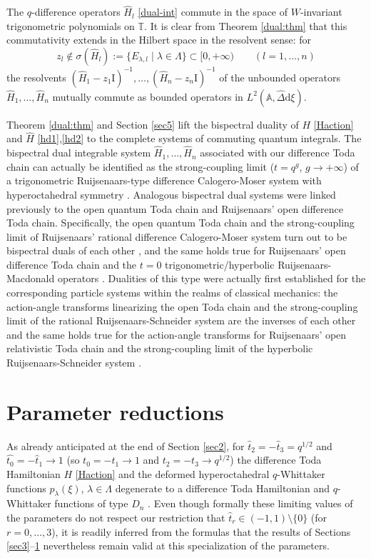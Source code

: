 \documentclass[reqno]{amsart}
\theoremstyle{remark}
\numberwithin{equation}{section}
\begin{document}
The $q$-difference operators  $\hat{H}_l$ \eqref{dual-int} commute in the space of $W$-invariant trigonometric polynomials on $\mathbb{T}$.
It is clear from Theorem \ref{dual:thm} that this commutativity extends in the Hilbert space in the resolvent sense: for $$z_l \not\in\sigma (\hat{H}_l):=\{ E_{\lambda ,l}\mid\lambda\in\Lambda\}\subset [0,+\infty) \qquad
(l=1,\ldots ,n) $$
the resolvents $(\hat{H}_1-z_1\text{I})^{-1},\ldots ,(\hat{H}_n-z_n\text{I})^{-1}$ of the unbounded operators 
$\hat{H}_1,\ldots,\hat{H}_n$ mutually commute as bounded operators in $L^2(\mathbb{A},\hat{\Delta}\text{d}\xi)$.

Theorem \ref{dual:thm} and Section \ref{sec5}  lift the bispectral duality of $H$ \eqref{Haction} and $\hat{H}$  \eqref{hd1},\eqref{hd2}  to the complete systems of commuting quantum integrals.
The bispectral dual integrable system $\hat{H}_1,\ldots ,\hat{H}_n$ associated with our difference Toda chain can actually be identified as the strong-coupling limit ($t=q^g$, $g\to +\infty$) of a trigonometric Ruijsenaars-type
difference Calogero-Moser system with hyperoctahedral symmetry \cite{die:difference}.
Analogous bispectral dual systems were linked previously to the open quantum Toda chain and
Ruijsenaars' open difference Toda chain.
Specifically, the open quantum Toda chain and the strong-coupling limit of Ruijsenaars' rational difference
Calogero-Moser system turn out to be bispectral duals of each other
\cite{bab:equations,hal-rui:kernel,skl:bispectrality,koz:aspects}, and
 the same holds true for  Ruijsenaars' open difference Toda chain and the
$t=0$ trigonometric/hyperbolic Ruijsenaars-Macdonald operators \cite{ger-leb-obl:q-deformed,hal-rui:kernel,bor-cor:macdonald}.
Dualities of this type were actually first established for the corresponding particle systems within the realms of
 classical mechanics: the action-angle transforms linearizing the open Toda chain and the strong-coupling limit of the rational Ruijsenaars-Schneider system are the inverses of each other and the same holds true for
the action-angle transforms for Ruijsenaars' open relativistic Toda chain and the strong-coupling limit of the hyperbolic Ruijsenaars-Schneider system \cite{rui:relativistic,feh:action}.

\section{Parameter reductions}\label{sec7}
As already anticipated at the end of Section \ref{sec2},
for $\hat{t}_2=-\hat{t}_3=q^{1/2}$ and $\hat{t_0}=-\hat{t}_1\to 1$ (so $t_0=-t_1\to 1$ and $t_2=-t_3\to q^{1/2}$) the difference Toda Hamiltonian $H$ \eqref{Haction}  and the deformed hyperoctahedral $q$-Whittaker functions $p_\lambda (\xi)$, $\lambda\in\Lambda$ degenerate to a difference Toda Hamiltonian and $q$-Whittaker functions of type $D_n$ \cite{sur:discrete,kuz-tsy:quantum,eti:whittaker,sev:quantum,che:whittaker}. Even though formally these limiting values of the parameters do not respect our restriction that
$\hat{t}_r\in (-1,1)\setminus \{ 0\}$ (for $r=0,\ldots ,3$), it is readily inferred from the formulas that the results of Sections \ref{sec3}--\ref{sec7} nevertheless remain valid at this specialization of the parameters.
\end{document}
